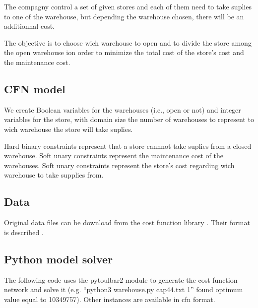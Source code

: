 \documentclass[letterpaper,10pt,openany,oneside,english]{sphinxmanual}
\begin{document}
\sphinxAtStartPar
The compagny control a set of given stores and each of them need to take suplies to one of the warehouse, but depending the warehouse chosen, there will be an additionnal cost.

\sphinxAtStartPar
The objective is to choose wich warehouse to open and to divide the store among the open warehouse ion order to minimize the total cost of the store’s cost and the maintenance cost.


\subsection{CFN model}
\label{\detokenize{examples/tuto_wlp:cfn-model}}
\sphinxAtStartPar
We create Boolean variables for the warehouses (i.e., open or not) and integer variables for the store, with domain size the number of warehouses to represent to wich warehouse the store will take suplies.

\sphinxAtStartPar
Hard binary constraints represent that a store cannnot take suplies from a closed warehouse.
Soft unary constraints represent the maintenance cost of the warehouses.
Soft unary constraints represent the store’s cost regarding wich warehouse to take supplies from.


\subsection{Data}
\label{\detokenize{examples/tuto_wlp:data}}
\sphinxAtStartPar
Original data files can be download from the cost function library . Their format is described .


\subsection{Python model solver}
\label{\detokenize{examples/tuto_wlp:python-model-solver}}
\sphinxAtStartPar
The following code uses the pytoulbar2 module to generate the cost function network and solve it (e.g. “python3 warehouse.py cap44.txt 1” found optimum value equal to 10349757). Other instances are available  in cfn format.

\sphinxAtStartPar
{}
\end{document}

